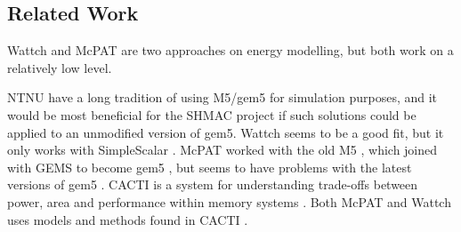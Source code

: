 \subsection{Related Work}

Wattch \cite{brooks2000wattch} and McPAT \cite{hpmcpat,li2013mcpat} are two
approaches on energy modelling, but both work on a relatively low level.

NTNU have a long tradition of using M5/gem5 for simulation purposes, and it
would be most beneficial for the SHMAC project if such solutions could be
applied to an unmodified version of gem5. Wattch seems to be a good fit, but it
only works with SimpleScalar \cite{wattchanalysis}. McPAT worked with the old M5
\cite{m5mcpatparser}, which joined with GEMS to become gem5 \cite{gem5hipeac},
but seems to have problems with the latest versions of gem5
\cite{mcpatgem5problems}. CACTI is a system for understanding trade-offs between
power, area and performance within memory systems
\cite{hpcacti,muralimanohar2010memory}. Both McPAT and Wattch uses models and
methods found in CACTI \cite{li2009mcpat}.



